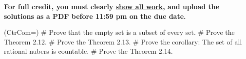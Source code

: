 \documentclass[11pt]{book}
\begin{document}
\thispagestyle{fancy}
\noindent	\textbf{For full credit, you must clearly \underline{show all work}, and upload the solutions as a PDF before 11:59 pm on the due date.}\hfill
\vspace{0.3in}

\begin{easylist}
\ListProperties(CtrCom=\fbox)
# Prove that the empty set is a subset of every set. 
\vspace{0.5in}
# Prove the Theorem 2.12.
\vspace{0.5in}
# Prove the Theorem 2.13.
\vspace{0.5in}
# Prove the corollary: The set of all rational nubers is countable.
\vspace{0.5in}
# Prove the Theorem 2.14.
 \end{easylist}
\end{document}
